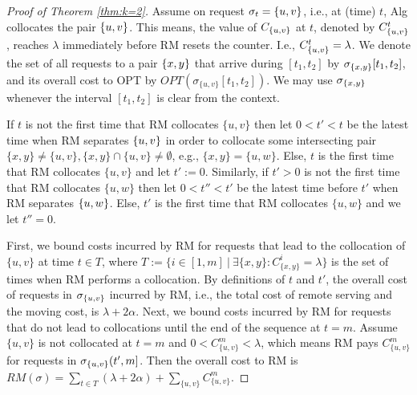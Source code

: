 \documentclass[manuscript,screen=true, review, anonymous]{acmart}
\newcommand{\OPT}{\textsf{OPT}\xspace}
\newcommand{\RM}{\textsf{RM}\xspace} %
\DeclarePairedDelimiter\set{\{}{\}}
\begin{document}
\begin{proof}[Proof of Theorem \ref{thm:k=2}]
	Assume on request $\sigma_{t}=\set{u,v}$, 
	i.e., at (time) $t$,
	Alg collocates the pair $\set{u,v}$.
	This means,
	the value of $C_{\set{u,v}}$ at $t$,
	denoted by $C^t_{\set{u,v}}$, 
	reaches $\lambda$ immediately before \RM resets the counter.
	I.e.,
	$ C^t_{\set{u,v}} = \lambda$.
	We denote the set of all requests to a pair $\set{x,y}$ that arrive
	during $[t_1,t_2]$ by $\sigma_{\set{x,y}}[t_1,t_2]$,
	and its overall cost to \OPT by
	$\mathit{OPT} (\sigma_{\{u,v\}}[t_1,t_2])$.
	We may use $\sigma_{\set{x,y}}$ whenever
	 the interval $[t_1,t_2]$ is clear from the context.
	
	If $t$ is not the first time that \RM collocates $\{u,v\}$ then
	let $0 < t' < t$ be the latest time when \RM separates $\set{u,v}$
	in order to collocate some intersecting pair
	$\{x,y\} \neq \{u,v\}, \{x,y\} \cap \{u,v\} \neq \emptyset$, 
	e.g.,
	$\{x,y\}=\{u,w\}$.
	Else,
	$t$ is the first time that \RM collocates $\{u,v\}$ and let $t' := 0$.
	Similarly,
	if $t' > 0$ is not the first time that \RM  collocates $\{u,w\}$ 
	then let $0 < t'' < t'$ be the latest time before $t'$ when \RM separates $\set{u,w}$.
	Else,
	$t'$ is the first time that \RM collocates $\{u,w\}$ and we let $t''=0$.
	
	First,
	we bound  costs incurred by \RM for requests that
	lead to the collocation of $\{u,v\}$ at time $t \in T$, where
	$T := \{ i \in [1,m] ~\vert~ \exists \{x,y\}: C^{i}_{\{x,y\}} = \lambda \}$
	is the set of times when \RM performs a collocation.
	By definitions of $t$ and $t'$,
	the overall cost of requests in $\sigma_{\set{u,v}}$ incurred by \RM,
	i.e., the total cost of remote serving
	and the moving cost, is
	$\lambda + 2\alpha$.	
	Next,
	we bound costs incurred by \RM
	for requests that do not lead to collocations until the  end of the sequence at $t=m$.
	Assume $\{u,v\}$ is not collocated at $t=m$
	and $0 < C^{m}_{ \{u,v\} } < \lambda $,
	which means \RM pays $C^{m}_{ \{u,v\} }$
	for  requests in $\sigma_{\set{u,v}}(t',m]$.
    Then the overall cost to \RM is
$	\mathit{RM} (\sigma)
=
\sum_{ t \in T}(\lambda + 2\alpha) +
\sum_{\{u,v\}} C^{m}_{\{u,v\}}	
$.
	

\end{proof}
\end{document}
